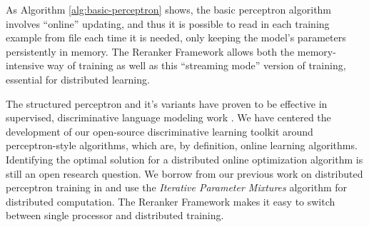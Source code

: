 \documentclass[a4paper]{article}
\let\textquotedbl="
\begin{document}

As Algorithm \ref{alg:basic-perceptron}
shows, the basic perceptron algorithm involves ``online'' updating,
and thus it is possible to read in each training example from file
each time it is needed, only keeping the model's parameters persistently
in memory. The Reranker Framework allows both the memory-intensive
way of training as well as this ``streaming mode'' version of training, essential for distributed learning.

The structured perceptron \cite{Collins02b} and it's variants have proven to
be effective in supervised, discriminative language modeling work
\cite{Roark07}.  We have centered the development of 
our open-source discriminative learning toolkit around perceptron-style
algorithms, which are, by definition, online learning algorithms. Identifying the
optimal solution for a distributed online optimization algorithm is still an open
research question. We borrow from our previous work on distributed perceptron
training in \cite{mcdonald10distributed,hall10distributed} and use the
\emph{Iterative Parameter Mixtures} algorithm for distributed computation.  The Reranker Framework makes it easy to switch between single processor and distributed training.
\end{document}
